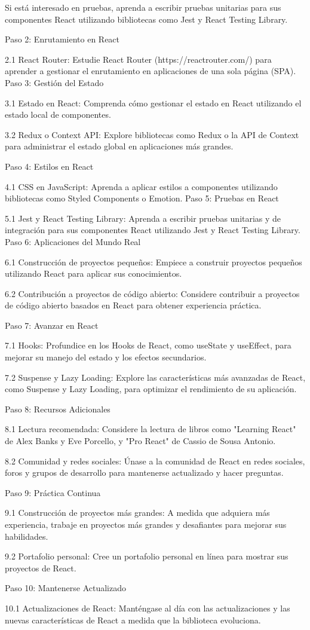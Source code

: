 \documentclass[executivepaper]{article}
\begin{document}
Si está interesado en pruebas, aprenda a escribir pruebas unitarias para sus componentes React utilizando bibliotecas como Jest y React Testing Library.












Paso 2: Enrutamiento en React

2.1 React Router: Estudie React Router (https://reactrouter.com/) para aprender a gestionar el enrutamiento en aplicaciones de una sola página (SPA).
Paso 3: Gestión del Estado

3.1 Estado en React: Comprenda cómo gestionar el estado en React utilizando el estado local de componentes.

3.2 Redux o Context API: Explore bibliotecas como Redux o la API de Context para administrar el estado global en aplicaciones más grandes.

Paso 4: Estilos en React

4.1 CSS en JavaScript: Aprenda a aplicar estilos a componentes utilizando bibliotecas como Styled Components o Emotion.
Paso 5: Pruebas en React

5.1 Jest y React Testing Library: Aprenda a escribir pruebas unitarias y de integración para sus componentes React utilizando Jest y React Testing Library.
Paso 6: Aplicaciones del Mundo Real

6.1 Construcción de proyectos pequeños: Empiece a construir proyectos pequeños utilizando React para aplicar sus conocimientos.

6.2 Contribución a proyectos de código abierto: Considere contribuir a proyectos de código abierto basados en React para obtener experiencia práctica.

Paso 7: Avanzar en React

7.1 Hooks: Profundice en los Hooks de React, como useState y useEffect, para mejorar su manejo del estado y los efectos secundarios.

7.2 Suspense y Lazy Loading: Explore las características más avanzadas de React, como Suspense y Lazy Loading, para optimizar el rendimiento de su aplicación.

Paso 8: Recursos Adicionales

8.1 Lectura recomendada: Considere la lectura de libros como "Learning React" de Alex Banks y Eve Porcello, y "Pro React" de Cassio de Sousa Antonio.

8.2 Comunidad y redes sociales: Únase a la comunidad de React en redes sociales, foros y grupos de desarrollo para mantenerse actualizado y hacer preguntas.

Paso 9: Práctica Continua

9.1 Construcción de proyectos más grandes: A medida que adquiera más experiencia, trabaje en proyectos más grandes y desafiantes para mejorar sus habilidades.

9.2 Portafolio personal: Cree un portafolio personal en línea para mostrar sus proyectos de React.

Paso 10: Mantenerse Actualizado

10.1 Actualizaciones de React: Manténgase al día con las actualizaciones y las nuevas características de React a medida que la biblioteca evoluciona.
\end{document}
